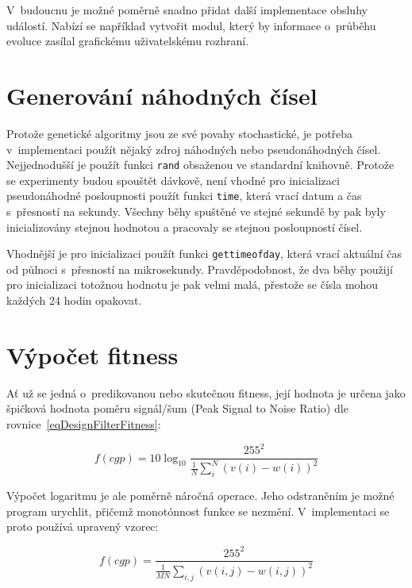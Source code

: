 V~budoucnu je možné poměrně snadno přidat další implementace obsluhy událostí. Nabízí se například vytvořit modul, který by informace o~průběhu evoluce zasílal grafickému uživatelskému rozhraní.

\section{Generování náhodných čísel}

Protože genetické algoritmy jsou ze své povahy stochastické, je potřeba v~implementaci použít nějaký zdroj náhodných nebo pseudonáhodných čísel. Nejjednodušší je použít funkci \texttt{rand} obsaženou ve standardní knihovně. Protože se experimenty budou spouštět dávkově, není vhodné pro inicializaci pseudonáhodné posloupnosti použít funkci \texttt{time}, která vrací datum a čas s~přesností na sekundy. Všechny běhy spuštěné ve stejné sekundě by pak byly inicializovány stejnou hodnotou a pracovaly se stejnou posloupností čísel.

Vhodnější je pro inicializaci použít funkci \texttt{gettimeofday}, která vrací aktuální čas od půlnoci s~přesností na mikrosekundy. Pravděpodobnost, že dva běhy použijí pro inicializaci totožnou hodnotu je pak velmi malá, přestože se čísla mohou každých 24 hodin opakovat.

\section{Výpočet fitness}
\label{secImplFitness}

Ať už se jedná o~predikovanou nebo skutečnou fitness, její hodnota je určena jako špičková hodnota poměru signál/šum (Peak Signal to Noise Ratio) dle rovnice~\ref{eqDesignFilterFitness}:

\begin{equation*}
    \label{eqImplFilterFitnessPSNR}
    \mathit{f\left(cgp\right)} = 10 \log_{10} \frac{255^2}{\frac{1}{N} \sum\limits_i^N \left( v\left( i \right) - w\left( i \right)  \right)^2 }
\end{equation*}

Výpočet logaritmu je ale poměrně náročná operace. Jeho odstraněním je možné program urychlit, přičemž monotónnost funkce se nezmění. V~implementaci se proto používá upravený vzorec:

\begin{equation}
    \label{eqImplFilterFitnessModifiedo}
    \mathit{f\left(cgp\right)} = \frac{255^2}{\frac{1}{MN} \sum\limits_{i,j} \left( v\left( i, j \right) - w\left( i, j \right)  \right)^2 }
\end{equation}

